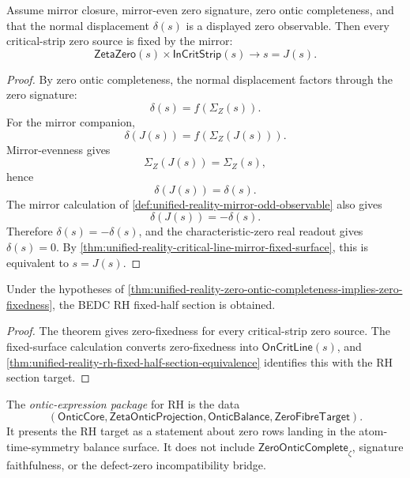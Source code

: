 \begin{theorem}
\label{thm:unified-reality-zero-ontic-completeness-implies-zero-fixedness}
Assume mirror closure, mirror-even zero signature, zero ontic
completeness, and that the normal displacement $\delta(s)$ is a displayed
zero observable.  Then every critical-strip zero source is fixed by the
mirror:
$$
\mathsf{ZetaZero}(s)\times\mathsf{InCritStrip}(s)
\to
s=J(s).
$$
\end{theorem}

\begin{proof}
By zero ontic completeness, the normal displacement factors through the
zero signature:
$$
\delta(s)=f(\Sigma_Z(s)).
$$
For the mirror companion,
$$
\delta(J(s))
=
f(\Sigma_Z(J(s))).
$$
Mirror-evenness gives
$$
\Sigma_Z(J(s))=\Sigma_Z(s),
$$
hence
$$
\delta(J(s))=\delta(s).
$$
The mirror calculation of
\autoref{def:unified-reality-mirror-odd-observable} also gives
$$
\delta(J(s))=-\delta(s).
$$
Therefore $\delta(s)=-\delta(s)$, and the characteristic-zero real
readout gives $\delta(s)=0$.  By
\autoref{thm:unified-reality-critical-line-mirror-fixed-surface}, this
is equivalent to $s=J(s)$.
\end{proof}

\begin{corollary}
\label{cor:unified-reality-zero-ontic-completeness-gives-rh-target}
Under the hypotheses of
\autoref{thm:unified-reality-zero-ontic-completeness-implies-zero-fixedness},
the BEDC RH fixed-half section is obtained.
\end{corollary}

\begin{proof}
The theorem gives zero-fixedness for every critical-strip zero source.
The fixed-surface calculation converts zero-fixedness into
$\mathsf{OnCritLine}(s)$, and
\autoref{thm:unified-reality-rh-fixed-half-section-equivalence}
identifies this with the RH section target.
\end{proof}

\begin{definition}
\label{def:unified-reality-ontic-expression-package}
The \emph{ontic-expression package} for RH is the data
$$
(\mathsf{OnticCore},
\mathsf{ZetaOnticProjection},
\mathsf{OnticBalance},
\mathsf{ZeroFibreTarget}).
$$
It presents the RH target as a statement about zero rows landing in the
atom-time-symmetry balance surface.  It does not include
$\mathsf{ZeroOnticComplete}_{\zeta}$, signature faithfulness, or the
defect-zero incompatibility bridge.
\end{definition}

